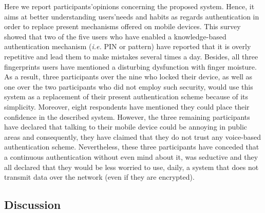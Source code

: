 \documentclass[cryptography,article,submit,moreauthors,pdftex,10pt,a4paper]{mdpi}
\begin{document}
Here we report participants\textquoteright opinions concerning the proposed system. Hence, it aims at better understanding users\textquoteright needs and habits as regards authentication in order to replace present mechanisms offered on mobile devices. This survey showed that two of the five users who have enabled a knowledge-based authentication mechanism (\textit{i.e.} PIN or pattern) have reported that it is overly repetitive and lead them to make mistakes several times a day. Besides, all three fingerprints users have mentioned a disturbing dysfunction with finger moisture. As a result, three participants over the nine who locked their device, as well as one over the two participants who did not employ such security, would use this system as a replacement of their present authentication scheme because of its simplicity. Moreover, eight respondents have mentioned they could place their confidence in the described system. However, the three remaining participants have declared that talking to their mobile device could be annoying in public areas and consequently, they have claimed that they do not trust any voice-based authentication scheme. Nevertheless, these three participants have conceded that a continuous authentication without even mind about it, was seductive and they all declared that they would be less worried to use, daily, a system that does not transmit data over the network (even if they are encrypted).

\subsection{Discussion}
\end{document}
